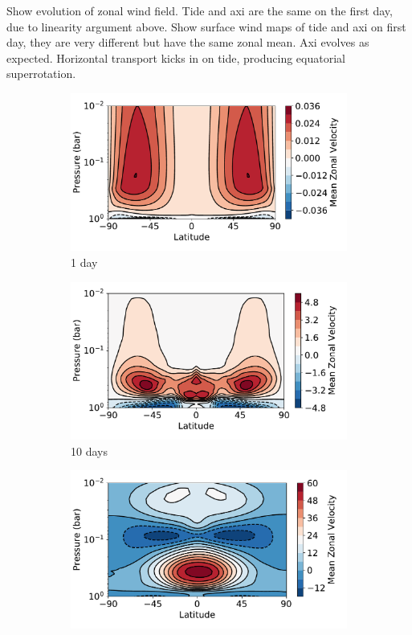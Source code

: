 Show evolution of zonal wind field. Tide and axi are the same on the first day, due to linearity argument above. Show surface wind maps of tide and axi on first day, they are very different but have the same zonal mean. Axi evolves as expected. Horizontal transport kicks in on tide, producing equatorial superrotation.



\begin{figure}
  \centering
  \begin{subfigure}[t]{0.32\textwidth}
    \includegraphics[width=\textwidth]{figures/eqm-zonal-flow/tide_1_u.pdf}
    \caption{1 day}
  \end{subfigure}
  \begin{subfigure}[t]{0.32\textwidth}
    \includegraphics[width=\textwidth]{figures/eqm-zonal-flow/tide_10_u.pdf}
    \caption{10 days}
  \end{subfigure}
  \begin{subfigure}[t]{0.32\textwidth}
    \includegraphics[width=\textwidth]{figures/eqm-zonal-flow/tide_500_u.pdf}

\end{subfigure}
\end{figure}
